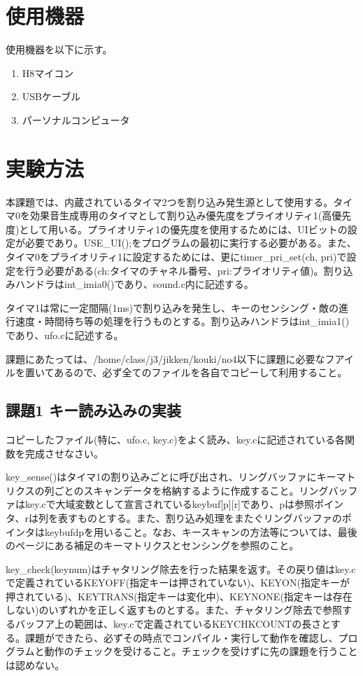 ﻿\documentclass{jarticle}
\begin{document}
\section{使用機器}
使用機器を以下に示す。
\begin{enumerate}
\item H8マイコン
\item USBケーブル
\item パーソナルコンピュータ
\end{enumerate}

\section{実験方法}
本課題では、内蔵されているタイマ2つを割り込み発生源として使用する。タイマ0を効果音生成専用のタイマとして割り込み優先度をプライオリティ1(高優先度)として用いる。プライオリティ1の優先度を使用するためには、UIビットの設定が必要であり。USE\_UI();をプログラムの最初に実行する必要がある。また、タイマ0をプライオリティ1に設定するためには、更にtimer\_pri\_set(ch, pri)で設定を行う必要がある(ch:タイマのチャネル番号、pri:プライオリティ値)。割り込みハンドラはint\_imia0()であり、sound.c内に記述する。


タイマ1は常に一定間隔(1ms)で割り込みを発生し、キーのセンシング・敵の進行速度・時間待ち等の処理を行うものとする。割り込みハンドラはint\_imia1()であり、ufo.cに記述する。


課題にあたっては、/home/class/j3/jikken/kouki/no4以下に課題に必要なフアイルを置いてあるので、必ず全てのファイルを各自でコピーして利用すること。


\subsection{課題1 キー読み込みの実装}
コピーしたファイル(特に、ufo.c, key.c)をよく読み、key.cに記述されている各関数を完成させなさい。


key\_sense()はタイマ1の割り込みごとに呼び出され、リングバッファにキーマトリクスの列ごとのスキャンデータを格納するように作成すること。リングバッファはkey.cで大域変数として宣言されているkeybuf[p][r]であり、pは参照ポインタ、rは列を表すものとする。また、割り込み処理をまたぐリングバッファのポインタはkeybufdpを用いること。なお、キースキャンの方法等については、最後のページにある補足のキーマトリクスとセンシングを参照のこと。


key\_check(keynum)はチャタリング除去を行った結果を返す。その戻り値はkey.cで定義されているKEYOFF(指定キーは押されていない)、KEYON(指定キーが押されている)、KEYTRANS(指定キーは変化中)、KEYNONE(指定キーは存在しない)のいずれかを正しく返すものとする。また、チャタリング除去で参照するバッフア上の範囲は、key.cで定義されているKEYCHKCOUNTの長さとする。課題ができたら、必ずその時点でコンパイル・実行して動作を確認し、プログラムと動作のチェックを受けること。チェックを受けずに先の課題を行うことは認めない。
\end{document}
